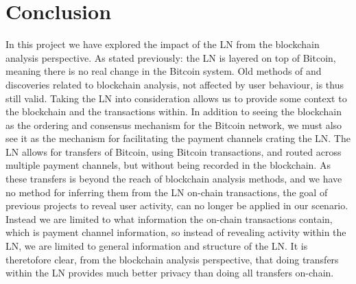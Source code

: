 \chapter{Conclusion}
\label{chap:conclusion}

In this project we have explored the impact of the LN from the blockchain analysis perspective. As stated previously: the LN is layered on top of Bitcoin, meaning there is no real change in the Bitcoin system. Old methods of and discoveries related to blockchain analysis, not affected by user behaviour, is thus still valid. Taking the LN into consideration allows us to provide some context to the blockchain and the transactions within. In addition to seeing the blockchain as the ordering and consensus mechanism for the Bitcoin network, we must also see it as the mechanism for facilitating the payment channels crating the LN. The LN allows for transfers of Bitcoin, using Bitcoin transactions, and routed across multiple payment channels, but without being recorded in the blockchain. As these transfers is beyond the reach of blockchain analysis methods, and we have no method for inferring them from the LN on-chain transactions, the goal of previous projects to reveal user activity, can no longer be applied in our scenario. Instead we are limited to what information the on-chain transactions contain, which is payment channel information, so instead of revealing activity within the LN, we are limited to general information and structure of the LN. It is theretofore clear, from the blockchain analysis perspective, that doing transfers within the LN provides much better privacy than doing all transfers on-chain.
\\

